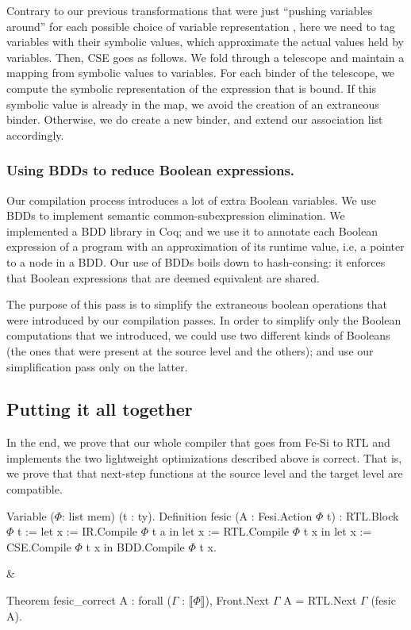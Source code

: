 \documentclass{llncs}
\newcommand{\denote}[1]{\llbracket #1 \rrbracket}
\begin{document}
Contrary to our previous transformations that were just ``pushing
variables around'' for each possible choice of variable representation
, here we need to tag variables with their symbolic values,
which approximate the actual values held by variables.
% 
%
Then, CSE goes as follows. We fold through a telescope and maintain a
mapping from symbolic values to variables. For each binder of the
telescope, we compute the symbolic representation of the expression
that is bound. 
%
If this symbolic value is already in the map, we avoid the creation of
an extraneous binder. Otherwise, we do create a new binder, and extend
our association list accordingly. 
 

\subsubsection{Using BDDs to reduce Boolean expressions.}
Our compilation process introduces a lot of extra Boolean
variables. We use BDDs to implement semantic common-subexpression
elimination. We implemented a BDD library in Coq; and we use it to
annotate each Boolean expression of a program with an approximation of
its runtime value, i.e, a pointer to a node in a BDD.
%
Our use of BDDs boils down to hash-consing: it enforces that Boolean
expressions that are deemed equivalent are shared.

The purpose of this pass is to simplify the extraneous boolean
operations that were introduced by our compilation passes. In order to
simplify only the Boolean computations that we introduced, we could
use two different kinds of Booleans (the ones that were present at the
source level and the others); and use our simplification pass only on
the latter.

\subsection{Putting it all together}
In the end, we prove that our whole compiler that goes from Fe-Si to
RTL and implements the two lightweight optimizations described above
is correct. That is, we prove that that next-step functions at the
source level and the target level are compatible.

\begin{twolistings}
  \begin{coq}
Variable ($\Phi$: list mem) (t : ty). 
Definition fesic  (A : Fesi.Action $\Phi$ t) : RTL.Block $\Phi$ t :=
  let x := IR.Compile $\Phi$  t a in
  let x := RTL.Compile $\Phi$ t x in 
  let x := CSE.Compile $\Phi$ t x in  
  BDD.Compile $\Phi$ t x.
\end{coq}
&
\begin{coq}
Theorem fesic_correct A :
forall ($\Gamma$ : $\denote{\Phi}$), 
Front.Next $\Gamma$ A = 
RTL.Next $\Gamma$ (fesic A).

$ $
\end{coq}
\end{twolistings}
\end{document}
